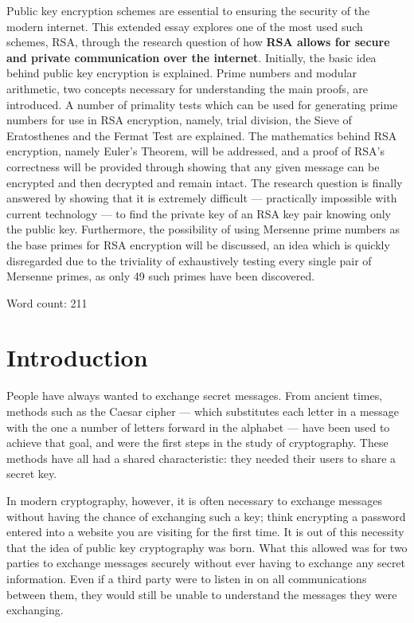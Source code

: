 \documentclass[12pt, titlepage]{article}
\let\oldsection\section
\renewcommand\section{\clearpage\oldsection}
\begin{document}
Public key encryption schemes are essential to ensuring the security of the modern internet.
This extended essay explores one of the most used such schemes, RSA, through the research
question of how \textbf{RSA allows for secure and private communication over the internet}.
Initially, the basic idea behind public key encryption is explained. Prime numbers and
modular arithmetic, two concepts necessary for understanding the main proofs, are
introduced. A number of primality tests which can be used for generating prime numbers for
use in RSA encryption, namely, trial division, the Sieve of Eratosthenes and the Fermat Test
are explained. The mathematics behind RSA encryption, namely Euler's Theorem, will be
addressed, and a proof of RSA's correctness will be provided through showing that any given
message can be encrypted and then decrypted and remain intact. The research question is
finally answered by showing that it is extremely difficult --- practically impossible with
current technology --- to find the private key of an RSA key pair knowing only the public
key.  Furthermore, the possibility of using Mersenne prime numbers as the base primes for
RSA encryption will be discussed, an idea which is quickly disregarded due to the triviality
of exhaustively testing every single pair of Mersenne primes, as only 49 such primes have
been discovered.  

Word count: 211

\thispagestyle{empty}

\tableofcontents

\section*{Introduction}

\setcounter{page}{1}
\label{sec:intro}

People have always wanted to exchange secret messages. From ancient times, methods such as
the Caesar cipher --- which substitutes each letter in a message with the one a number of
letters forward in the alphabet --- have been used to achieve that goal, and were the first
steps in the study of cryptography. These methods have all had a shared characteristic: they
needed their users to share a secret key.

In modern cryptography, however, it is often necessary to exchange messages without having
the chance of exchanging such a key; think encrypting a password entered into a website you
are visiting for the first time. It is out of this necessity that the idea of public key
cryptography was born. What this allowed was for two parties to exchange messages securely
without ever having to exchange any secret information. Even if a third party were to listen
in on all communications between them, they would still be unable to understand the messages
they were exchanging.
\end{document}
